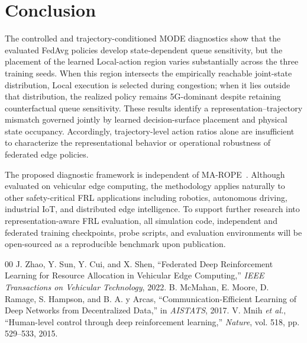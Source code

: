 \documentclass[conference]{IEEEtran}
\begin{document}
\section{Conclusion}
The controlled and trajectory-conditioned MODE diagnostics show that the evaluated FedAvg policies develop state-dependent queue sensitivity, but the placement of the learned Local-action region varies substantially across the three training seeds. When this region intersects the empirically reachable joint-state distribution, Local execution is selected during congestion; when it lies outside that distribution, the realized policy remains 5G-dominant despite retaining counterfactual queue sensitivity. These results identify a representation--trajectory mismatch governed jointly by learned decision-surface placement and physical state occupancy. Accordingly, trajectory-level action ratios alone are insufficient to characterize the representational behavior or operational robustness of federated edge policies. 

The proposed diagnostic framework is independent of MA-ROPE~\cite{marope}. Although evaluated on vehicular edge computing, the methodology applies naturally to other safety-critical FRL applications including robotics, autonomous driving, industrial IoT, and distributed edge intelligence. To support further research into representation-aware FRL evaluation, all simulation code, independent and federated training checkpoints, probe scripts, and evaluation environments will be open-sourced as a reproducible benchmark upon publication.

\begin{thebibliography}{00}
J. Zhao, Y. Sun, Y. Cui, and X. Shen, ``Federated Deep Reinforcement Learning for Resource Allocation in Vehicular Edge Computing,'' \emph{IEEE Transactions on Vehicular Technology}, 2022.
B. McMahan, E. Moore, D. Ramage, S. Hampson, and B. A. y Arcas, ``Communication-Efficient Learning of Deep Networks from Decentralized Data,'' in \emph{AISTATS}, 2017.
V. Mnih \emph{et al.}, ``Human-level control through deep reinforcement learning,'' \emph{Nature}, vol. 518, pp. 529--533, 2015.
\end{thebibliography}
\end{document}
